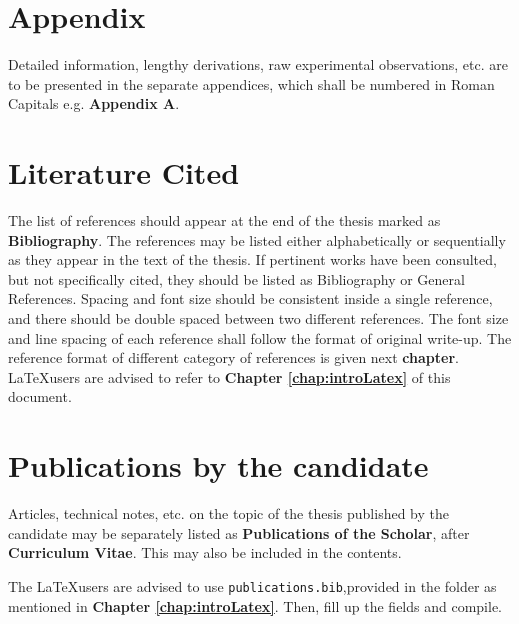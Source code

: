 \section{Appendix}
Detailed information, lengthy derivations, raw experimental observations, etc. are to be presented in the separate appendices, which shall be numbered in Roman Capitals e.g. \textbf{Appendix A}.
\section{Literature Cited} 
The list of references should appear at the end of the thesis marked as \textbf{Bibliography}. The references may be listed either alphabetically or sequentially as they appear in the text of the thesis. If pertinent works have been consulted, but not specifically cited, they should be listed as Bibliography or General References. Spacing and font size should be consistent inside a single reference, and there should be double spaced between two different references. The font size and line spacing of each reference shall follow the format of original write-up. The reference format of different category of references is given next \textbf{chapter}. \LaTeX users are advised to refer to \textbf{Chapter \ref{chap:introLatex}} of this document.
\section{Publications by the candidate}
Articles, technical notes, etc. on the topic of the thesis published by the candidate may be separately listed as \textbf{Publications of the Scholar}, after \textbf{Curriculum Vitae}. This may also be included in the contents.

\par The \LaTeX users are advised to use \verb+publications.bib+,provided in the folder as mentioned in  \textbf{Chapter \ref{chap:introLatex}}. Then, fill up the fields and compile.

